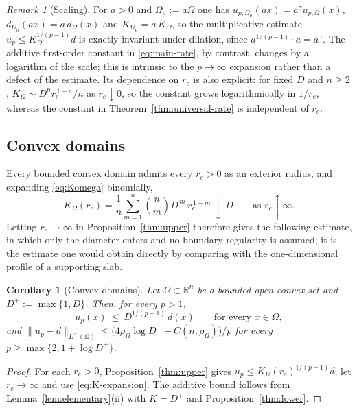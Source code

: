 \documentclass[11pt]{article}
\newcommand{\R}{\mathbb R}
\newcommand{\norm}[1]{\lVert #1\rVert}
\newtheorem{corollary}[theorem]{Corollary}
\theoremstyle{definition}
\theoremstyle{remark}
\newtheorem{remark}[theorem]{Remark}
\begin{document}
\begin{remark}[Scaling]\label{rem:scaling}
For $a>0$ and $\Omega_a:=a\Omega$ one has
$u_{p,\Omega_a}(ax)=a^{\gamma}u_{p,\Omega}(x)$,
$d_{\Omega_a}(ax)=a\,d_\Omega(x)$ and $K_{\Omega_a}=a\,K_\Omega$, so the
multiplicative estimate $u_p\le K_\Omega^{1/(p-1)}d$ is exactly invariant
under dilation, since $a^{1/(p-1)}\cdot a=a^{\gamma}$. The additive
first-order constant in \eqref{eq:main-rate}, by contrast, changes by a
logarithm of the scale; this is intrinsic to the $p\to\infty$ expansion
rather than a defect of the estimate. Its dependence on $r_e$ is also
explicit: for fixed $D$ and $n\ge2$, $K_\Omega\sim D^nr_e^{\,1-n}/n$ as
$r_e\downarrow0$, so the constant grows logarithmically in $1/r_e$, whereas
the constant in Theorem~\ref{thm:universal-rate} is independent of $r_e$.
\end{remark}

\subsection{Convex domains}\label{subsec:convex}
Every bounded convex domain admits every $r_e>0$ as an exterior radius, and
expanding \eqref{eq:Komega} binomially,
\begin{equation}\label{eq:K-expansion}
K_\Omega(r_e)=\frac1n\sum_{m=1}^{n}\binom nm D^{\,m}\,r_e^{\,1-m}
\ \downarrow\ D
\qquad\text{as }r_e\uparrow\infty .
\end{equation}
Letting $r_e\to\infty$ in Proposition~\ref{thm:upper} therefore gives the
following estimate, in which only the diameter enters and no boundary
regularity is assumed; it is the estimate one would obtain directly by
comparing with the one-dimensional profile of a supporting slab.
\begin{corollary}[Convex domains]\label{cor:convex}
Let $\Omega\subset\R^n$ be a bounded open convex set and $D^+:=\max\{1,D\}$.
Then, for every $p>1$,
\begin{equation}\label{eq:slab}
u_p(x)\ \le\ D^{1/(p-1)}\,d(x)
\qquad\text{for every }x\in\Omega,
\end{equation}
and
$\norm{u_p-d}_{L^\infty(\Omega)}\le\bigl(4\rho_\Omega\log D^+ + C(n,\rho_\Omega)\bigr)/p$
for every $p\ge\max\{2,1+\log D^+\}$.
\end{corollary}
\begin{proof}
For each $r_e>0$, Proposition~\ref{thm:upper} gives
$u_p\le K_\Omega(r_e)^{1/(p-1)}d$; let $r_e\to\infty$ and use
\eqref{eq:K-expansion}. The additive bound follows from
Lemma~\ref{lem:elementary}(ii) with $K=D^+$ and Proposition~\ref{thm:lower}.
\end{proof}
\end{document}
